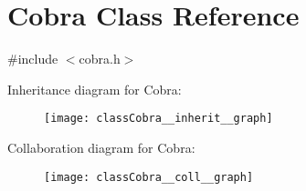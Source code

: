 \hypertarget{classCobra}{}\section{Cobra Class Reference}
\label{classCobra}


{\ttfamily \#include $<$cobra.\+h$>$}



Inheritance diagram for Cobra\+:
\nopagebreak
\begin{figure}[H]
\begin{center}
\leavevmode
\texttt{[image: classCobra\_\_inherit\_\_graph]}
\end{center}
\end{figure}


Collaboration diagram for Cobra\+:
\nopagebreak
\begin{figure}[H]
\begin{center}
\leavevmode
\texttt{[image: classCobra\_\_coll\_\_graph]}
\end{center}
\end{figure}
